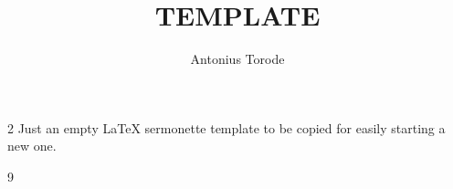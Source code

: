 \documentclass[10pt]{article}
\title{TEMPLATE}
\author{Antonius Torode}
\begin{document}
\maketitle
\thispagestyle{fancy}



\begin{multicols}{2}
Just an empty LaTeX sermonette template to be copied for easily starting a new one.



\begin{thebibliography}{9}
{\footnotesize
	
}
\end{thebibliography}

\end{multicols}


\end{document}
